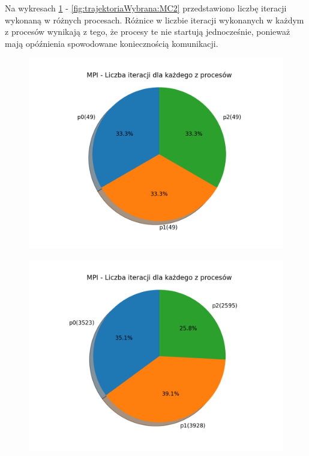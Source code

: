 \documentclass[11pt, a4paper, oneside]{article}
\begin{document}
Na wykresach  \ref{fig:trajektoriaWybrana:MC1} - \ref{fig:trajektoriaWybrana:MC2} przedstawiono liczbę iteracji wykonaną w różnych procesach. Różnice w liczbie iteracji wykonanych w każdym z procesów wynikają z tego, że procesy te nie startują jednocześnie, ponieważ mają opóźnienia spowodowane koniecznością komunikacji.


\begin{figure}[H]
\centering
\begin{minipage}[b]{\dimexpr.5\textwidth-1em}
  \centering
  \includegraphics[width=1\linewidth]{grafiki/MPI_PSO_T1/MPI_PSO_T1_procIter.png}
  \label{fig:trajektoriaWybrana:PSO1}
\end{minipage} \hfill
\begin{minipage}[b]{\dimexpr.5\textwidth-1em}
  \centering
  \includegraphics[width=1\linewidth]{grafiki/MPI_MC_T1/MPI_MC_T1_procIter.png}
  \label{fig:trajektoriaWybrana:MC1}
\end{minipage}
\end{figure}
\end{document}
